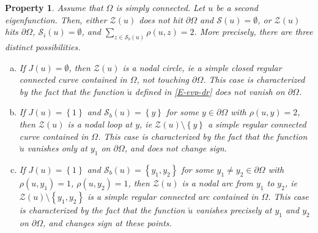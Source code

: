 \documentclass[12pt,a4paper]{amsart}
\theoremstyle{plain} %
\newtheorem{property}[theorem]{Property}
\theoremstyle{definition}
\numberwithin{equation}{section}
\numberwithin{figure}{section}
\numberwithin{table}{section}
\newcommand{\cS}{\mathcal{S}}
\newcommand{\cZ}{\mathcal{Z}}
\newcommand{\sm}{\!\setminus\!}
\newcommand{\set}[1]{\left\lbrace #1 \right\rbrace}
\begin{document}
{\begin{property}\label{P-hmn-nl0}
Assume that $\Omega$ is \emph{simply connected}. Let $u$ be a second eigenfunction. Then, either $\cZ(u)$ does not hit $\partial \Omega$ and $\cS(u) = \emptyset$, or $\cZ(u)$ hits $\partial \Omega$, $\cS_i(u) = \emptyset$, and $\sum_{z\in \cS_b(u)} \rho(u,z) = 2$. More precisely, there are three distinct possibilities.
\begin{enumerate}[(a)]
  \item If $J(u) = \emptyset$, then $\cZ(u)$ is a nodal circle, ie a simple closed regular  connected curve contained in $\Omega$, not touching $\partial \Omega$. This case is characterized by the fact that the function $\breve{u}$  defined in \eqref{E-evp-dr} does not vanish on $\partial \Omega$.
  \item If $J(u) = \set{1}$ and $\cS_b(u) = \set{y}$ for some $y \in  \partial \Omega$ with $\rho(u,y)=2$, then $\cZ(u)$ is a nodal loop at $y$, ie $\cZ(u) \sm \set{y}$ a simple regular connected curve contained in $\Omega$.  This case is characterized by the fact that the function $\breve{u}$ vanishes only at $y_1$ on $\partial \Omega$, and does not change sign.
  \item If $J(u) = \set{1}$ and $\cS_b(u) = \set{y_1,y_2}$ for some $y_1 \neq y_2 \in  \partial \Omega$ with $\rho(u,y_1)=1$, $\rho(u,y_2)=1$, then $\cZ(u)$ is a nodal arc from $y_1$ to $y_2$, ie $\cZ(u) \sm \set{y_1,y_2}$ is a simple regular connected arc contained in $\Omega$.  This case is characterized by the fact that the function $\breve{u}$ vanishes precisely at $y_1$ and $y_2$ on $\partial \Omega$, and changes sign at these points.
\end{enumerate}
\end{property}%


}
\end{document}
